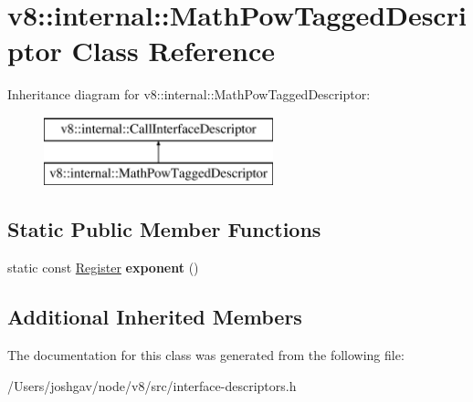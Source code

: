 \hypertarget{classv8_1_1internal_1_1_math_pow_tagged_descriptor}{}\section{v8\+:\+:internal\+:\+:Math\+Pow\+Tagged\+Descriptor Class Reference}
\label{classv8_1_1internal_1_1_math_pow_tagged_descriptor}
Inheritance diagram for v8\+:\+:internal\+:\+:Math\+Pow\+Tagged\+Descriptor\+:\begin{figure}[H]
\begin{center}
\leavevmode
\includegraphics[height=2.000000cm]{classv8_1_1internal_1_1_math_pow_tagged_descriptor}
\end{center}
\end{figure}
\subsection*{Static Public Member Functions}
\begin{DoxyCompactItemize}
\item 
static const \hyperlink{structv8_1_1internal_1_1_register}{Register} {\bfseries exponent} ()\hypertarget{classv8_1_1internal_1_1_math_pow_tagged_descriptor_ae39051afd094e3c4da6f5657170dcdf0}{}\label{classv8_1_1internal_1_1_math_pow_tagged_descriptor_ae39051afd094e3c4da6f5657170dcdf0}

\end{DoxyCompactItemize}
\subsection*{Additional Inherited Members}


The documentation for this class was generated from the following file\+:\begin{DoxyCompactItemize}
\item 
/\+Users/joshgav/node/v8/src/interface-\/descriptors.\+h\end{DoxyCompactItemize}
